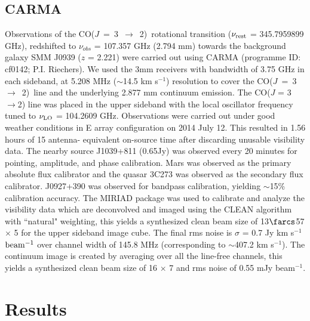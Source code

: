 \documentclass[twocolumn,apj,numberedappendix]{emulateapj}
\newcommand{\rarr}{$\rightarrow$}
\newcommand{\CO}{\mbox{CO($J$ = 3 $\rightarrow$ 2) }}
\newcommand{\pmOne}{$^{-1}$}
\begin{document}
\subsection{CARMA} \label{sec:carmadata}
Observations of the \CO rotational transition ($\nu_{\rm rest}$ = 345.7959899 GHz),
redshifted to $\nu_{obs}$ = 107.357 GHz (2.794 mm) towards the background galaxy SMM
J0939 ($z$ = 2.221) were carried out using CARMA (programme ID: cf0142; P.I. Riechers).
We used the 3mm receivers with bandwidth of 3.75 GHz in each sideband, at 5.208 MHz ($\sim$14.5 km s\pmOne)
resolution to cover the \CO line and the underlying 2.877 mm continuum emission. The CO($J$ = 3 
\rarr 2) line was placed in the
upper sideband with the local oscillator frequency tuned to $\nu_{\rm LO}$ = 104.2609 GHz.
Observations were carried out under good
weather conditions in E array configuration on 2014 July 12. This resulted in 1.56 hours of 15 antenna-
equivalent on-source time after discarding unusable visibility data.
The nearby source J1039+811 (0.65Jy) was observed every 20 minutes for
pointing, amplitude, and phase calibration. Mars was observed as the primary
absolute flux calibrator and the quasar 3C273 was observed as the secondary
flux calibrator. J0927+390 was observed for bandpass calibration, yielding $\sim
$15\% calibration accuracy.
The {\sc MIRIAD} package was used to calibrate and analyze the visibility data which are deconvolved and imaged using
the CLEAN algorithm with ``natural" weighting, this yields a synthesized clean beam size of 13$\farcs$57 $\times$ 
5 for the upper sideband image cube. The final rms noise is $\sigma$ = 0.7 Jy km s\pmOne $\rm beam^{-1}$ over channel width of 145.8 MHz (corresponding to $\sim$407.2 km s\pmOne). The continuum image is created by
averaging over all the line-free channels, this yields a synthesized clean beam size of 16 $\times$ 7 and 
rms noise of 0.55 mJy beam\pmOne.

\section{Results}\label{sec:res}
\end{document}
